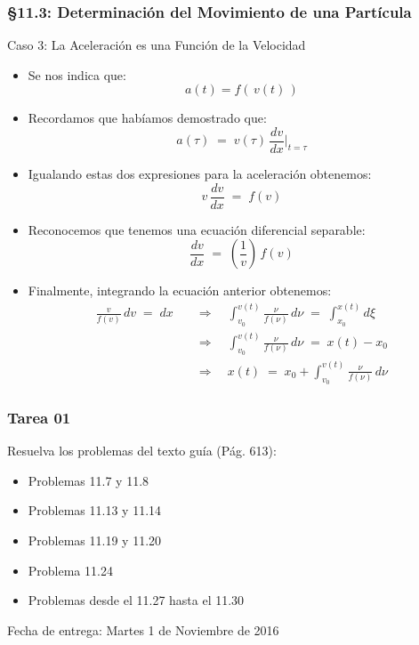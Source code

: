 \documentclass[ 10pt, xcolor = dvipsnames]{beamer}
\begin{document}
\begin{frame}[allowframebreaks]
\frametitle{\S 11.3: Determinaci\'on del Movimiento de una Part\'icula}

Caso 3: La Aceleraci\'on es una Funci\'on de la Velocidad
\begin{itemize}
\item Se nos indica que: 
\[
a(t) = f( \, v(t) \, )
\]
\item Recordamos que hab\'iamos demostrado que: 
\[
a(\tau) \; = \; v(\tau) \, \frac{dv}{dx}\bigg|_{ t = \tau }
\]
\item Igualando estas dos expresiones para la aceleraci\'on obtenemos: 
\[
v \, \frac{dv}{dx} \; = \; f(v)
\]
\framebreak
\item Reconocemos que tenemos una ecuaci\'on diferencial separable: 
\[
\frac{dv}{dx} \; = \; \left( \frac{1}{v} \right) \, f(v)
\]
\item Finalmente, integrando la ecuaci\'on anterior obtenemos: 
\begin{align*}
\frac{v}{f(v)} \, dv \; = \; dx \quad 
& \Longrightarrow \quad 
\int_{v_0}^{v(t)} \frac{\nu}{f(\nu)} \, d\nu \; = \; 
\int_{x_0}^{x(t)} d\xi \\[2ex]
& \Longrightarrow \quad 
\int_{v_0}^{v(t)} \frac{\nu}{f(\nu)} \, d\nu \; = \; 
x(t) - x_0 \\[2ex]
& \Longrightarrow \quad 
x(t) \; = \; x_0 + 
\int_{v_0}^{v(t)} \frac{\nu}{f(\nu)} \, d\nu
\end{align*}
\end{itemize}

\end{frame}

\begin{frame}[allowframebreaks]
\frametitle{Tarea 01}

Resuelva los problemas del texto gu\'ia (P\'ag. 613): 
\begin{itemize}
\item Problemas 11.7 y 11.8
\item Problemas 11.13 y 11.14
\item Problemas 11.19 y 11.20
\item Problema 11.24
\item Problemas desde el 11.27 hasta el 11.30
\end{itemize}
Fecha de entrega: Martes 1 de Noviembre de 2016

\end{frame}
\end{document}
